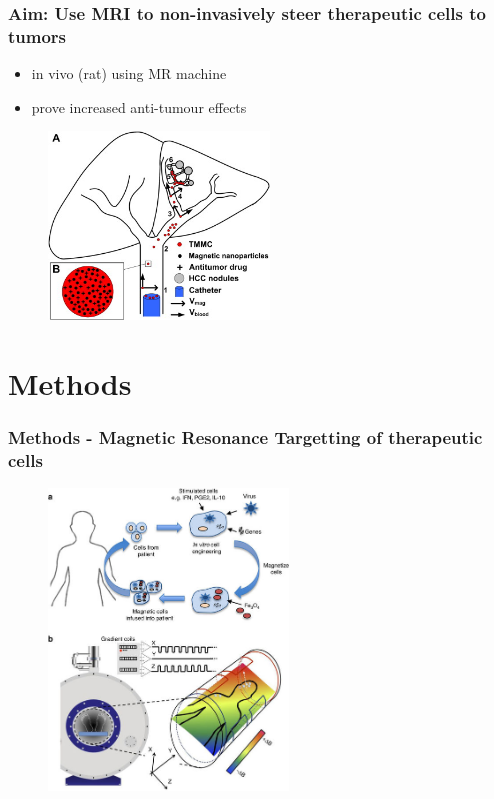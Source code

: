 \documentclass[8pt,xcolor=table]{beamer}
\begin{document}
\begin{frame}
\frametitle{Aim: Use MRI to non-invasively steer therapeutic cells to tumors}

\begin{itemize}
 \item in vivo (rat) using MR machine
 \item prove increased anti-tumour effects
\end{itemize}


 \begin{figure}
 \centering
 \includegraphics[height=5cm]{steering}
 \end{figure}
 
\end{frame}


\section{Methods}

\begin{frame}
\frametitle{Methods - Magnetic Resonance Targetting of therapeutic cells}
 \begin{figure}
 \centering
 \includegraphics[height=8cm]{mrt_principle}
 \end{figure} 
\end{frame}
\end{document}
